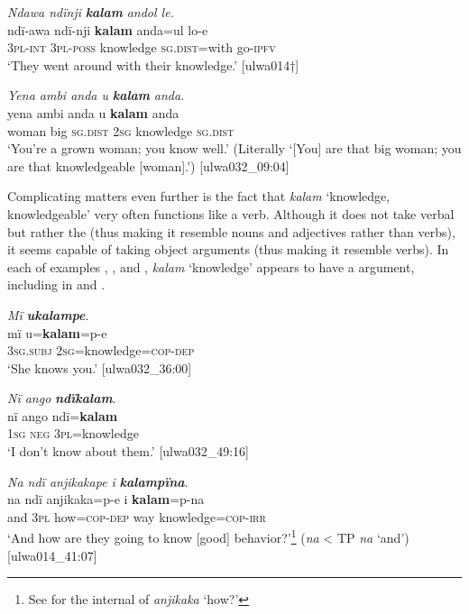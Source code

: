 \ea%
    \label{ex:adj:14}
          \textit{Ndawa ndïnji} \textbf{\textit{kalam}} \textit{andol le.}\\
\gll    ndï-awa  ndï-nji    \textbf{kalam}      anda=ul    lo-e\\
    3\textsc{pl-int}  3\textsc{pl-poss}  knowledge    \textsc{sg.dist}=with  go-\textsc{ipfv}\\
\glt `They went around with their knowledge.’ [ulwa014†]
\z

\ea%
    \label{ex:adj:15}

          \textit{Yena ambi anda u} \textbf{\textit{kalam}} \textit{anda.}\\
\gll    yena  ambi  anda    u    \textbf{kalam}    anda\\
    woman  big    \textsc{sg.dist}  2\textsc{sg}  knowledge  \textsc{sg.dist}\\
\glt `You’re a grown woman; you know well.’ (Literally ‘[You] are that big woman; you are that knowledgeable [woman].’) [ulwa032\_09:04]
\z

Complicating matters even further is the fact that \textit{kalam} ‘knowledge, knowledgeable’ very often functions like a verb. Although it does not take  verbal   but rather the  (thus making it resemble nouns and adjectives rather than verbs), it seems capable of taking object arguments (thus making it resemble verbs). In each of examples , , and , \textit{kalam} ‘knowledge’ appears to have a  argument, including   in  and .

\ea%
    \label{ex:adj:16}
          \textit{Mï} \textbf{\textit{ukalampe}}.\\
\gll mï      u=\textbf{kalam}=p-e\\
    3\textsc{sg.subj}  2\textsc{sg}=knowledge=\textsc{cop-dep}\\
\glt `She knows you.’ [ulwa032\_36:00]
\z

\ea%
    \label{ex:adj:17}
          \textit{Nï ango} \textbf{\textit{ndïkalam}}.\\
\gll nï    ango  ndï=\textbf{kalam}\\
    1\textsc{sg}  \textsc{neg}   3\textsc{pl}=knowledge\\
\glt `I don’t know about them.’ [ulwa032\_49:16]
\z

\ea%
    \label{ex:adj:18}
          \textit{Na ndï anjikakape i} \textbf{\textit{kalampïna}}.\\
\gll na    ndï  anjikaka=p-e  i    \textbf{kalam}=p-na\\
    and    3\textsc{pl}  how=\textsc{cop-dep}  way  knowledge=\textsc{cop-irr}\\
\glt `And how are they going to know [good] behavior?’\footnote{See  for the internal  of \textit{anjikaka} ‘how?’} (\textit{na} < TP \textit{na} ‘and’) [ulwa014\_41:07]
\z


